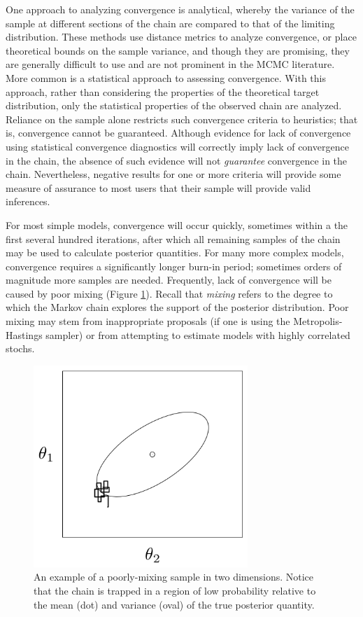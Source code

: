\documentclass[]{book}
\begin{document}
One approach to analyzing convergence is analytical, whereby the variance of the sample at different sections of the chain are compared to that of the limiting distribution. These methods use distance metrics to analyze convergence, or place theoretical bounds on the sample variance, and though they are promising, they are generally difficult to use and are not prominent in the MCMC literature. More common is a statistical approach to assessing convergence. With this approach, rather than considering the properties of the theoretical target distribution, only the statistical properties of the observed chain are analyzed. Reliance on the sample alone restricts such convergence criteria to heuristics; that is, convergence cannot be guaranteed. Although evidence for lack of convergence using statistical convergence diagnostics will correctly imply lack of convergence in the chain, the absence of such evidence will not \emph{guarantee} convergence in the chain. Nevertheless, negative results for one or more criteria will provide some measure of assurance to most users that their sample will provide valid inferences.

For most simple models, convergence will occur quickly, sometimes within a the first several hundred iterations, after which all remaining samples of the chain may be used to calculate posterior quantities. For many more complex models, convergence requires a significantly longer burn-in period; sometimes  orders of magnitude more samples are needed. Frequently, lack of convergence will be caused by poor mixing (Figure \ref{fig:mix}). Recall that \emph{mixing} refers to the degree to which the Markov chain explores the support of the posterior distribution. Poor mixing may stem from inappropriate proposals (if one is using the Metropolis-Hastings sampler) or from attempting to estimate models with highly correlated stochs.

\begin{figure}[ht]
\begin{center}
\includegraphics[height=3in]{poor_mixing.png}
\caption{An example of a poorly-mixing sample in two dimensions. Notice that the chain is trapped in a region of low probability relative to the mean (dot) and variance (oval) of the true posterior quantity.}
\label{fig:mix}
\end{center}
\end{figure}
\end{document}
